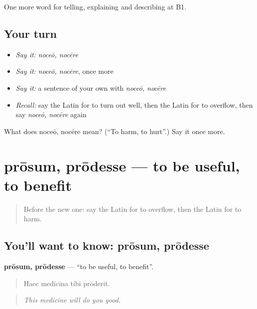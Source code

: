 \begin{grammarlens}[title={What you've built}]
One more word for telling, explaining and describing at B1.
\end{grammarlens}

\subsection*{Your turn}
\begin{itemize}
\raggedright
  \item \emph{Say it:} \emph{noceō, nocēre}
  \item \emph{Say it:} \emph{noceō, nocēre}, once more
  \item \emph{Say it:} a sentence of your own with \emph{noceō, nocēre}
  \item \emph{Recall:} say the Latin for to turn out well, then the Latin for to overflow, then say \emph{noceō, nocēre} again
\end{itemize}

\begin{tcolorbox}[breakable,colback=teal!4,colframe=teal!35!black,title={Before you move on}]
What does noceō, nocēre mean? (\textquotedblleft{}To harm, to hurt\textquotedblright{}.) Say it once more.
\end{tcolorbox}
\section[prōsum, prōdesse]{prōsum, prōdesse — to be useful, to benefit}

\label{lesson:LA-C374-prosum}



\begin{quote}
Before the new one: say the Latin for to overflow, then the Latin for to harm.
\end{quote}

\subsection*{You'll want to know: prōsum, prōdesse}
\textbf{prōsum, prōdesse} — \textquotedblleft{}to be useful, to benefit\textquotedblright{}.

\begin{quote}
Haec medicīna tibi prōderit.
\end{quote}

\begin{quote}
\emph{This medicine will do you good.}
\end{quote}

